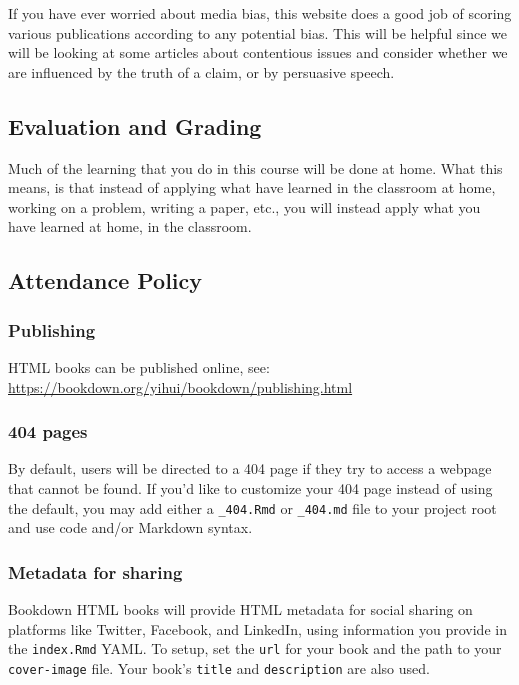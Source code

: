 \documentclass[]{tufte-handout}
\begin{document}
If you have ever worried about media bias, this website does a good job of scoring various publications according to any potential bias. This will be helpful since we will be looking at some articles about contentious issues and consider whether we are influenced by the truth of a claim, or by persuasive speech.

\hypertarget{evaluation-and-grading}{%
\subsection{Evaluation and Grading}\label{evaluation-and-grading}}

Much of the learning that you do in this course will be done at home. What this means, is that instead of applying what have learned in the classroom at home, working on a problem, writing a paper, etc., you will instead apply what you have learned at home, in the classroom.

\hypertarget{attendance-policy}{%
\subsection{Attendance Policy}\label{attendance-policy}}

\hypertarget{publishing}{%
\subsubsection{Publishing}\label{publishing}}

HTML books can be published online, see: \url{https://bookdown.org/yihui/bookdown/publishing.html}

\hypertarget{pages}{%
\subsubsection{404 pages}\label{pages}}

By default, users will be directed to a 404 page if they try to access a webpage that cannot be found. If you'd like to customize your 404 page instead of using the default, you may add either a \texttt{\_404.Rmd} or \texttt{\_404.md} file to your project root and use code and/or Markdown syntax.

\hypertarget{metadata-for-sharing}{%
\subsubsection{Metadata for sharing}\label{metadata-for-sharing}}

Bookdown HTML books will provide HTML metadata for social sharing on platforms like Twitter, Facebook, and LinkedIn, using information you provide in the \texttt{index.Rmd} YAML. To setup, set the \texttt{url} for your book and the path to your \texttt{cover-image} file. Your book's \texttt{title} and \texttt{description} are also used.
\end{document}
